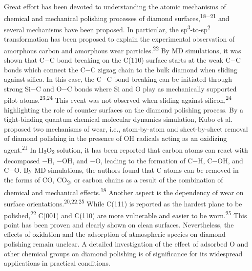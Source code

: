\documentclass{article}
\begin{document}
Great effort has been devoted to understanding the atomic mechanisms of chemical and mechanical polishing processes of diamond surfaces,\textsuperscript{18−21} and several mechanisms have been proposed. In particular, the sp\textsuperscript{3}-to-sp\textsuperscript{2} transformation has been proposed to explain the experimental observation of amorphous carbon and amorphous wear particles.\textsuperscript{22} By MD simulations, it was shown that C−C bond breaking on the C(110) surface starts at the weak C−C bonds which connect the C−C zigzag chain to the bulk diamond when sliding against silica. In this case, the C−C bond breaking can be initiated through strong Si−C and O−C bonds where Si and O play as mechanically supported pilot atoms.\textsuperscript{23,24} This event was not observed when sliding against silicon,\textsuperscript{24} highlighting the role of counter surfaces on the diamond polishing process. By a tight-binding quantum chemical molecular dynamics simulation, Kubo et al. proposed two mechanisms of wear, i.e., atom-by-atom and sheet-by-sheet removal of diamond polishing in the presence of OH radicals acting as an oxidizing agent.\textsuperscript{21} In H\textsubscript{2}O\textsubscript{2} solution, it has been reported that carbon atoms can react with decomposed −H, −OH, and −O, leading to the formation of C−H, C−OH, and C−O. By MD simulations, the authors found that C atoms can be removed in the forms of CO, CO\textsubscript{2}, or carbon chains as a result of the combination of chemical and mechanical effects.\textsuperscript{18} Another aspect is the dependency of wear on surface orientations.\textsuperscript{20,22,25} While C(111) is reported as the hardest plane to be polished,\textsuperscript{22} C(001) and C(110) are more vulnerable and easier to be worn.\textsuperscript{25} This point has been proven and clearly shown on clean surfaces. Nevertheless, the effects of oxidation and the adsorption of atmospheric species on diamond polishing remain unclear. A detailed investigation of the effect of adsorbed O and other chemical groups on diamond polishing is of significance for its widespread applications in practical conditions.
\end{document}
